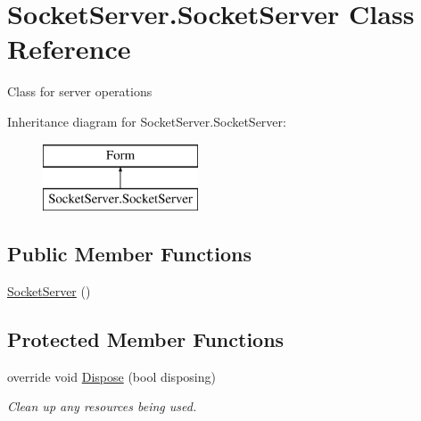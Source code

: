 \hypertarget{class_socket_server_1_1_socket_server}{}\section{Socket\+Server.\+Socket\+Server Class Reference}
\label{class_socket_server_1_1_socket_server}


Class for server operations  


Inheritance diagram for Socket\+Server.\+Socket\+Server\+:\begin{figure}[H]
\begin{center}
\leavevmode
\includegraphics[height=2.000000cm]{class_socket_server_1_1_socket_server}
\end{center}
\end{figure}
\subsection*{Public Member Functions}
\begin{DoxyCompactItemize}
\item 
\hyperlink{class_socket_server_1_1_socket_server_a3f04ad72de3cc8570741afd76a169e4d}{Socket\+Server} ()
\end{DoxyCompactItemize}
\subsection*{Protected Member Functions}
\begin{DoxyCompactItemize}
\item 
override void \hyperlink{class_socket_server_1_1_socket_server_a577f703fecf496140d420e0049159905}{Dispose} (bool disposing)
\begin{DoxyCompactList}\small\item\em Clean up any resources being used. \end{DoxyCompactList}\end{DoxyCompactItemize}
